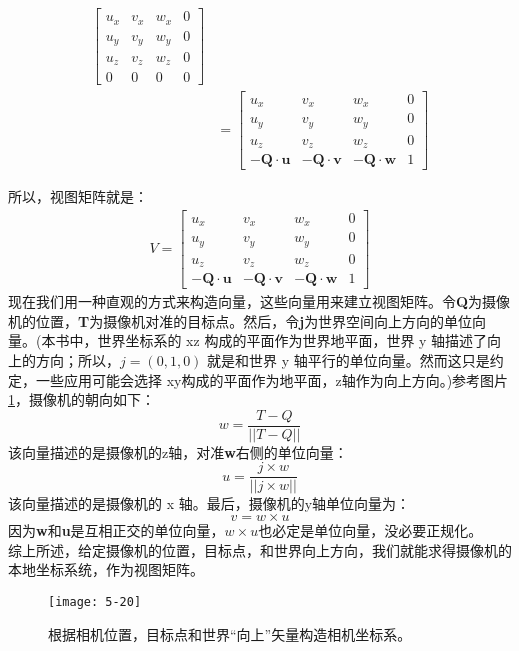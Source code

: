 \begin{flushleft}
\begin{align*}
\begin{bmatrix}
u_{x} & v_{x} & w_{x} & 0\\
u_{y} & v_{y} & w_{y} & 0\\
u_{z} & v_{z} & w_{z} & 0\\
0 & 0 & 0 & 0
\end{bmatrix} \\
&=\begin{bmatrix}
u_{x} & v_{x} & w_{x} & 0\\
u_{y} & v_{y} & w_{y} & 0\\
u_{z} & v_{z} & w_{z} & 0\\
\mathbf{-Q\cdot u} & \mathbf{-Q\cdot v} & \mathbf{-Q\cdot w} & 1
\end{bmatrix}
\end{align*}

所以，视图矩阵就是：
\begin{align*}
V=\begin{bmatrix}
u_{x} & v_{x} & w_{x} & 0\\
u_{y} & v_{y} & w_{y} & 0\\
u_{z} & v_{z} & w_{z} & 0\\
\mathbf{-Q\cdot u} & \mathbf{-Q\cdot v} & \mathbf{-Q\cdot w} & 1
\end{bmatrix}
\end{align*}
现在我们用一种直观的方式来构造向量，这些向量用来建立视图矩阵。令\textbf{Q}为摄像机的位置，\textbf{T}为摄像机对准的目标点。然后，令\textbf{j}为世界空间向上方向的单位向量。(本书中，世界坐标系的 xz 构成的平面作为世界地平面，世界 y 轴描述了向上的方向；所以，$j=(0,1,0)$ 就是和世界 y 轴平行的单位向量。然而这只是约定，一些应用可能会选择 xy构成的平面作为地平面，z轴作为向上方向。)参考图片\ref{fig:5-20}，摄像机的朝向如下：
$$w=\frac{T-Q}{||T-Q||}$$
该向量描述的是摄像机的z轴，对准\textbf{w}右侧的单位向量：\\
$$u=\frac{j\times w}{||j \times w||}$$
该向量描述的是摄像机的 x 轴。最后，摄像机的y轴单位向量为：\\
$$v=w \times u$$
因为\textbf{w}和\textbf{u}是互相正交的单位向量，$w\times u$也必定是单位向量，没必要正规化。\\
综上所述，给定摄像机的位置，目标点，和世界向上方向，我们就能求得摄像机的本地坐标系统，作为视图矩阵。
\begin{figure}[t]
    \texttt{[image: 5-20]}
    \centering
    \caption{根据相机位置，目标点和世界“向上”矢量构造相机坐标系。}
    \label{fig:5-20}
\end{figure}


\end{flushleft}
